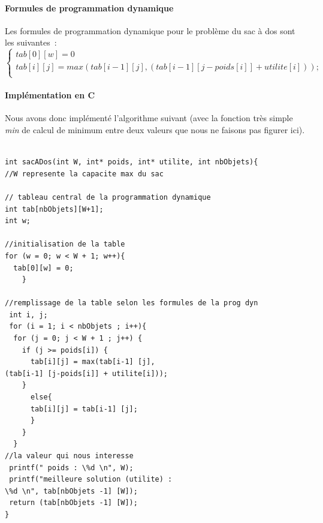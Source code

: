 \documentclass[a4paper, 12pt]{article}
\begin{document}

\paragraph{Formules de programmation dynamique}

Les formules de programmation dynamique pour le problème du sac à dos
sont les suivantes~:
\begin{equation}
\begin{cases}
tab[0][w] = 0 \\
tab[i][j] = max(tab[i-1] [j], (tab[i-1] [j-poids[i]] + utilite[i])); \\
\end{cases}
\end{equation}

\paragraph{Implémentation en C}

Nous avons donc implémenté l'algorithme suivant (avec la fonction très
simple \textit{min} de calcul de minimum entre deux valeurs que nous
ne faisons pas figurer ici).

\begin{lstlisting}

int sacADos(int W, int* poids, int* utilite, int nbObjets){ 
//W represente la capacite max du sac

// tableau central de la programmation dynamique
int tab[nbObjets][W+1]; 
int w;

//initialisation de la table
for (w = 0; w < W + 1; w++){
  tab[0][w] = 0;
    }

//remplissage de la table selon les formules de la prog dyn
 int i, j;
 for (i = 1; i < nbObjets ; i++){
  for (j = 0; j < W + 1 ; j++) {
    if (j >= poids[i]) {
      tab[i][j] = max(tab[i-1] [j], 
(tab[i-1] [j-poids[i]] + utilite[i]));
    }
      else{
      tab[i][j] = tab[i-1] [j];
      }
    }
  }
//la valeur qui nous interesse
 printf(" poids : \%d \n", W);
 printf("meilleure solution (utilite) :
\%d \n", tab[nbObjets -1] [W]);
 return (tab[nbObjets -1] [W]);
}

\end{lstlisting}
\end{document}
